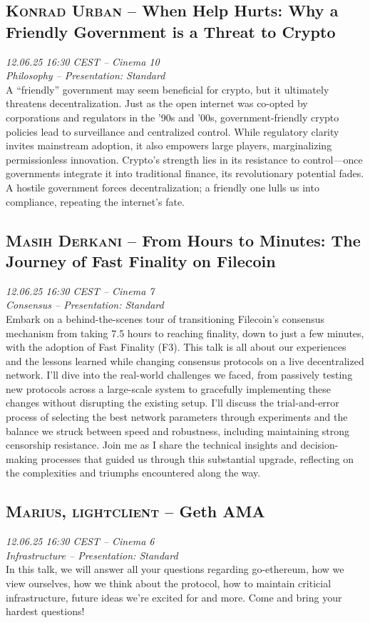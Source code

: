 \subsection {\textsc{Konrad Urban}  -- When Help Hurts: Why a Friendly Government is a Threat to Crypto} \noindent \textit {12.06.25 16:30 CEST -- Cinema 10\\ Philosophy -- Presentation: Standard}\\[1em] A “friendly” government may seem beneficial for crypto, but it ultimately threatens decentralization. Just as the open internet was co-opted by corporations and regulators in the ’90s and ’00s, government-friendly crypto policies lead to surveillance and centralized control. While regulatory clarity invites mainstream adoption, it also empowers large players, marginalizing permissionless innovation. Crypto’s strength lies in its resistance to control—once governments integrate it into traditional finance, its revolutionary potential fades. A hostile government forces decentralization; a friendly one lulls us into compliance, repeating the internet’s fate.

\clearpage
\subsection {\textsc{Masih Derkani}  -- From Hours to Minutes: The Journey of Fast Finality on Filecoin} \noindent \textit {12.06.25 16:30 CEST -- Cinema 7\\ Consensus -- Presentation: Standard}\\[1em] Embark on a behind-the-scenes tour of transitioning Filecoin’s consensus mechanism from taking 7.5 hours to reaching finality, down to just a few minutes, with the adoption of Fast Finality (F3). This talk is all about our experiences and the lessons learned while changing consensus protocols on a live decentralized network. I’ll dive into the real-world challenges we faced, from passively testing new protocols across a large-scale system to gracefully implementing these changes without disrupting the existing setup. I’ll discuss the trial-and-error process of selecting the best network parameters through experiments and the balance we struck between speed and robustness, including maintaining strong censorship resistance. Join me as I share the technical insights and decision-making processes that guided us through this substantial upgrade, reflecting on the complexities and triumphs encountered along the way.

\clearpage
\subsection {\textsc{Marius, lightclient}  -- Geth AMA} \noindent \textit {12.06.25 16:30 CEST -- Cinema 6\\ Infrastructure -- Presentation: Standard}\\[1em] In this talk, we will answer all your questions regarding go-ethereum, how we view ourselves, how we think about the protocol, how to maintain criticial infrastructure, future ideas we're excited for and more. Come and bring your hardest questions!

